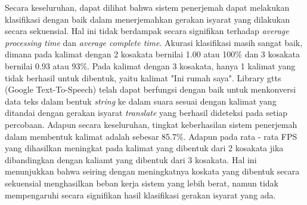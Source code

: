 Secara keseluruhan, dapat dilihat bahwa sistem penerjemah dapat melakukan klasifikasi dengan baik dalam menerjemahkan gerakan isyarat yang dilakukan secara sekuensial. Hal ini tidak berdampak secara signifikan terhadap \emph{average processing time} dan \emph{average complete time}. Akurasi klasifikasi masih sangat baik, dimana pada kalimat dengan 2 kosakata bernilai 1.00 atau 100\% dan 3 kosakata bernilai 0.93 atau 93\%. Pada kalimat dengan 3 kosakata, hanya 1 kalimat yang tidak berhasil untuk dibentuk, yaitu kalimat "Ini rumah saya". Library gtts (Google Text-To-Speech) telah dapat berfungsi dengan baik untuk menkonversi data teks dalam bentuk \emph{string} ke dalam suara sesuai dengan kalimat yang ditandai dengan gerakan isyarat \emph{translate} yang berhasil dideteksi pada setiap percobaan. Adapun secara keseluruhan, tingkat keberhasilan sistem penerjemah dalam membentuk kalimat adalah sebesar 85.7\%. Adapun pada rata - rata FPS yang dihasilkan meningkat pada kalimat yang dibentuk dari 2 kosakata jika dibandingkan dengan kaliamt yang dibentuk dari 3 kosakata. Hal ini menunjukkan bahwa seiring dengan meningkatnya koskata yang dibentuk secara sekuensial menghasilkan beban kerja sistem yang lebih berat, namun tidak mempengaruhi secara signifikan hasil klasifikasi gerakan isyarat yang ada.



